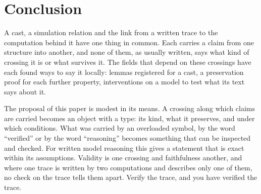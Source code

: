 \section{Conclusion}
\label{sec:conclusion}

A cast, a simulation relation and the link from a written trace to the computation
behind it have one thing in common. Each carries a claim from one structure into
another, and none of them, as usually written, says what kind of crossing it is or what
survives it. The fields that depend on these crossings have each found ways to say it
locally: lemmas registered for a cast, a preservation proof for each further property,
interventions on a model to test what its text says about it.

The proposal of this paper is modest in its means. A crossing along which claims are
carried becomes an object with a type: its kind, what it preserves, and under which
conditions. What was carried by an overloaded symbol, by the word ``verified'' or by the
word ``reasoning'' becomes something that can be inspected and checked. For written
model reasoning this gives a statement that is exact within its assumptions. Validity is
one crossing and faithfulness another, and where one trace is written by two
computations and describes only one of them, no check on the trace tells them apart.
Verify the trace, and you have verified the trace.
